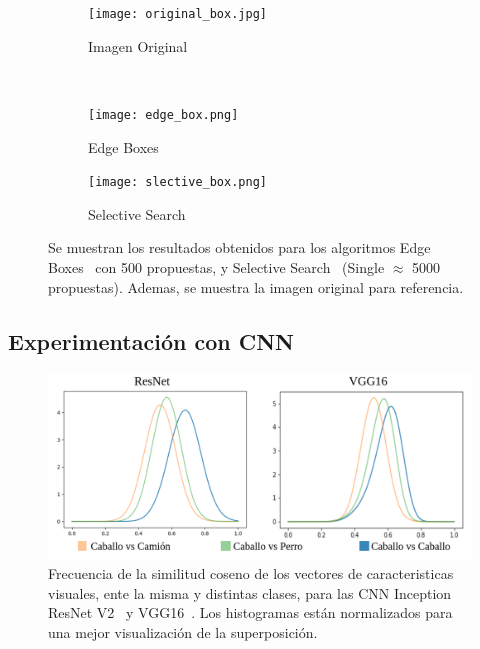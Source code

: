 \begin{figure}
	\begin{center}
		\begin{subfigure}{.5\textwidth}
			\centering
			\texttt{[image: original\_box.jpg]}
			\caption{Imagen Original}
			\label{fig:sfig1}
		\end{subfigure}\\
	\end{center}
	\begin{subfigure}{.5\textwidth}
		\centering
		\texttt{[image: edge\_box.png]}
		\caption{Edge Boxes~\cite{zitnick2014edge}}
		\label{fig:sfig2}
	\end{subfigure}
	\begin{subfigure}{.5\textwidth}
		\centering
		\texttt{[image: slective\_box.png]}
		\caption{Selective Search~\cite{uijlings2013selective}}
		\label{fig:sfig3}
	\end{subfigure}
	\begin{center}
	\end{center}
	\caption{Se muestran los resultados obtenidos para los algoritmos Edge Boxes~\cite{zitnick2014edge} con 500 propuestas, y Selective Search~\cite{uijlings2013selective} (Single $\approx$ 5000 propuestas). Ademas, se muestra la imagen original para referencia.}
	\label{fig:boxes_cuantitativos}
\end{figure}


\subsection{Experimentación con CNN} \label{ssec:experimentacionconcnn}
\begin{figure}
	\centering
	\includegraphics[width=1\linewidth]{img/vgg-vs-resnet}
	\caption{Frecuencia de la similitud coseno de los vectores de caracteristicas visuales, ente la misma y distintas clases, para las CNN Inception ResNet V2~\cite{resnet} y VGG16~\cite{simonyan2014very}. Los histogramas están normalizados para una mejor visualización de la superposición.}
	\label{fig:vgg-vs-resnet}
\end{figure}

